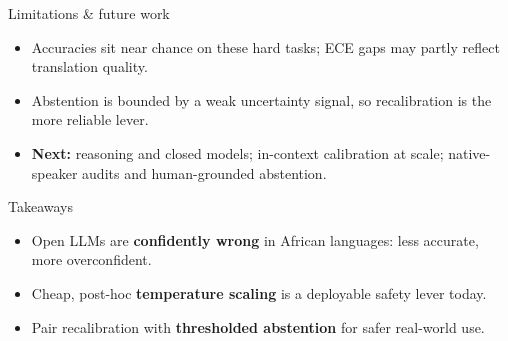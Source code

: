 \documentclass[aspectratio=169,11pt]{beamer}
\newcommand{\teamflags}[1][1]{%
\begin{tikzpicture}[scale=#1, every node/.style={scale=#1}]
  \begin{scope}[shift={(0,0)}]
    \fill[ethgreen]  (0,1.0667) rectangle (2.4,1.6);
    \fill[ethyellow] (0,0.5333) rectangle (2.4,1.0667);
    \fill[ethred]    (0,0)      rectangle (2.4,0.5333);
    \fill[ethblue] (1.2,0.8) circle (0.46);
    \node[star, star points=5, star point ratio=2.3, fill=ethyellow,
          draw=ethyellow, minimum size=7.5mm, inner sep=0pt] at (1.2,0.8) {};
    \draw[black,line width=0.4pt] (0,0) rectangle (2.4,1.6);
    \node[font=\scriptsize] at (1.2,-0.35) {Ethiopia};
  \end{scope}
  \begin{scope}[shift={(3.6,0)}]
    \fill[white]   (0,0)   rectangle (2.4,1.6);
    \fill[nggreen] (0,0)   rectangle (0.8,1.6);
    \fill[nggreen] (1.6,0) rectangle (2.4,1.6);
    \draw[black,line width=0.4pt] (0,0) rectangle (2.4,1.6);
    \node[font=\scriptsize] at (1.2,-0.35) {Nigeria};
  \end{scope}
  \begin{scope}[shift={(7.2,0)}]
    \fill[black]   (0,1.12) rectangle (2.4,1.6);
    \fill[white]   (0,1.04) rectangle (2.4,1.12);
    \fill[kered]   (0,0.56) rectangle (2.4,1.04);
    \fill[white]   (0,0.48) rectangle (2.4,0.56);
    \fill[kegreen] (0,0)    rectangle (2.4,0.48);
    \draw[white,line width=1.3pt] (0.98,0.25) -- (1.42,1.35);
    \draw[white,line width=1.3pt] (1.42,0.25) -- (0.98,1.35);
    \fill[kered] (1.2,0.8) ellipse (0.2 and 0.42);
    \draw[white,line width=0.9pt] (1.2,0.8) ellipse (0.2 and 0.42);
    \fill[white] (1.08,0.77) rectangle (1.32,0.83);
    \draw[black,line width=0.4pt] (0,0) rectangle (2.4,1.6);
    \node[font=\scriptsize] at (1.2,-0.35) {Kenya};
  \end{scope}
\end{tikzpicture}}
\begin{document}
\begin{frame}{Limitations \& future work}
  \begin{itemize}
    \item Accuracies sit near chance on these hard tasks; ECE gaps may partly reflect translation quality.
    \item Abstention is bounded by a weak uncertainty signal, so recalibration is the more reliable lever.
    \item \textbf{Next:} reasoning and closed models; in-context calibration at scale; native-speaker audits and human-grounded abstention.
  \end{itemize}
\end{frame}

\begin{frame}{Takeaways}
  \begin{itemize}
    \item Open LLMs are \textbf{confidently wrong} in African languages: less accurate, more overconfident.
    \item Cheap, post-hoc \textbf{temperature scaling} is a deployable safety lever today.
    \item Pair recalibration with \textbf{thresholded abstention} for safer real-world use.
  \end{itemize}
\end{frame}

\end{document}
